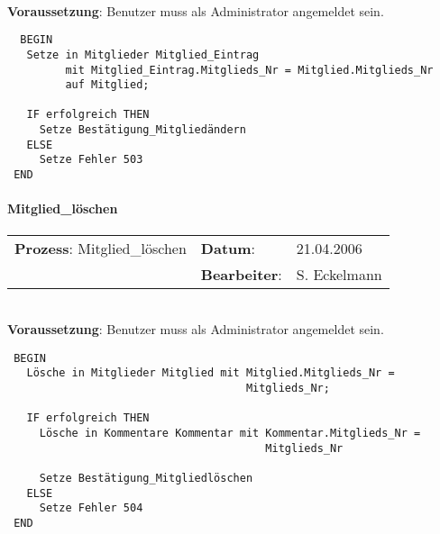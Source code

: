 \hrulefill\\
\textbf{Voraussetzung}: Benutzer muss als Administrator angemeldet sein.
\begin{verbatim}
  BEGIN
   Setze in Mitglieder Mitglied_Eintrag
         mit Mitglied_Eintrag.Mitglieds_Nr = Mitglied.Mitglieds_Nr
         auf Mitglied;
  
   IF erfolgreich THEN
     Setze Bestätigung_Mitgliedändern
   ELSE
     Setze Fehler 503
 END
\end{verbatim}
\hrulefill



\paragraph{Mitglied\_löschen}
\begin{tabular}[t]{p{9.5cm}ll}
\textbf{Prozess}: Mitglied\_löschen  	&\textbf{Datum}:      &21.04.2006\\
					&\textbf{Bearbeiter}: &S. Eckelmann\\
\end{tabular}

\hrulefill\\
\textbf{Voraussetzung}: Benutzer muss als Administrator angemeldet sein.
\begin{verbatim}
 BEGIN
   Lösche in Mitglieder Mitglied mit Mitglied.Mitglieds_Nr = 
                                     Mitglieds_Nr;

   IF erfolgreich THEN
     Lösche in Kommentare Kommentar mit Kommentar.Mitglieds_Nr = 
                                        Mitglieds_Nr

     Setze Bestätigung_Mitgliedlöschen
   ELSE
     Setze Fehler 504
 END
\end{verbatim}
\hrulefill